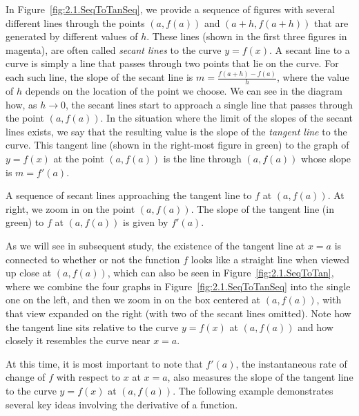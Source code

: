 In Figure~\ref{fig:2.1.SeqToTanSeq}, we provide a sequence of figures with several different lines through the points $(a, f(a))$ and $(a+h,f(a+h))$ that are generated by different values of $h$.  These lines (shown in the first three figures in magenta), are often called \emph{secant lines}  to the curve $y = f(x)$.  A secant line to a curve is simply a line that passes through two points that lie on the curve.  For each such line, the slope of the secant line is $m = \frac{f(a+h) - f(a)}{h}$, where the value of $h$ depends on the location of the point we choose.  We can see in the diagram how, as $h \to 0$, the secant lines start to approach a single line that passes through the point $(a,f(a))$.  In the situation where the limit of the slopes of the secant lines exists, we say that the resulting value is the slope of the \emph{tangent line} to the curve.  This tangent line (shown in the right-most figure in green) to the graph of $y = f(x)$ at the point $(a,f(a))$ is the line through $(a,f(a))$ whose slope is $m = f'(a)$.  

\begin{marginfigure} %
\caption{A sequence of secant lines approaching the tangent line to $f$ at $(a,f(a))$.  At right, we zoom in on the point $(a,f(a))$.  The slope of the tangent line (in green) to $f$ at $(a,f(a))$ is given by $f'(a)$.} \label{fig:2.1.SeqToTan}
\end{marginfigure}

As we will see in subsequent study, the existence of the tangent line at $x = a$ is connected to whether or not the function $f$ looks like a straight line when viewed up close at $(a,f(a))$, which can also be seen in Figure~\ref{fig:2.1.SeqToTan}, where we combine the four graphs in Figure~\ref{fig:2.1.SeqToTanSeq} into the single one on the left, and then we zoom in on the box centered at $(a,f(a))$, with that view expanded on the right (with two of the secant lines omitted).  Note how the tangent line sits relative to the curve $y = f(x)$ at $(a,f(a))$ and how closely it resembles the curve near $x = a$.

At this time, it is most important to note that $f'(a)$, the instantaneous rate of change of $f$ with respect to $x$ at $x = a$, also measures the slope of the tangent line to the curve $y = f(x)$ at $(a,f(a))$.  The following example demonstrates several key ideas involving the derivative of a function.

